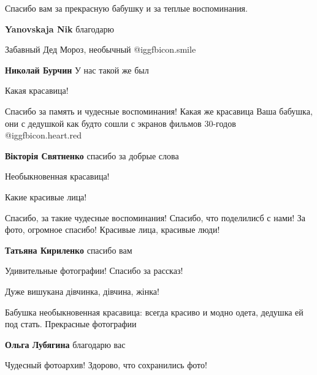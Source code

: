  
 
 
 
 
\zzSecCmt

\begin{itemize} %
Спасибо вам за прекрасную бабушку и за теплые воспоминания.

\textbf{Yanovskaja Nik} благодарю

Забавный Дед Мороз, необычный  @igg{fbicon.smile} 

\textbf{Николай Бурчин} У нас такой же был

Какая красавица!


Спасибо за память и чудесные воспоминания! Какая же красавица Ваша бабушка, они
с дедушкой как будто сошли с экранов фильмов 30-годов @igg{fbicon.heart.red}


\textbf{Вікторія Святненко} спасибо за добрые слова

Необыкновенная красавица!

Какие красивые лица!


Спасибо, за такие чудесные воспоминания! Спасибо, что поделилисб с нами! За
фото, огромное спасибо! Красивые лица, красивые люди!

\textbf{Татьяна Кириленко} спасибо вам

Удивительные фотографии! Спасибо за рассказ!

Дуже вишукана
дівчинка, дівчина, жінка!


Бабушка необыкновенная красавица: всегда красиво и модно одета, дедушка ей под
стать. Прекрасные фотографии


\textbf{Ольга Лубягина} благодарю вас

Чудесный фотоархив! Здорово, что сохранились фото!


\end{itemize}
